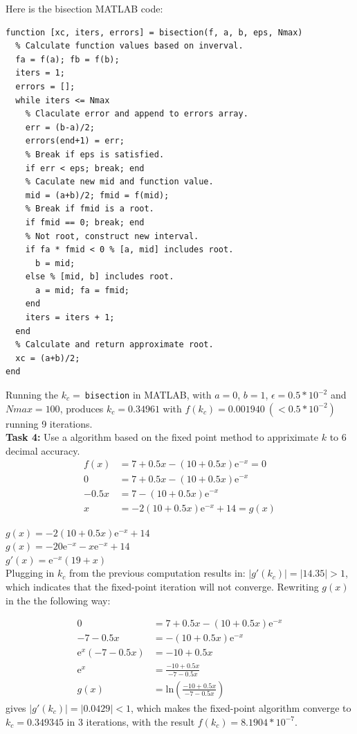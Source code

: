 \documentclass{article}
\begin{document}
  \noindent
  Here is the bisection MATLAB code:

  \begin{verbatim}
function [xc, iters, errors] = bisection(f, a, b, eps, Nmax)
  % Calculate function values based on inverval.
  fa = f(a); fb = f(b);
  iters = 1;
  errors = [];
  while iters <= Nmax
    % Claculate error and append to errors array.
    err = (b-a)/2;
    errors(end+1) = err;
    % Break if eps is satisfied.
    if err < eps; break; end
    % Caculate new mid and function value.
    mid = (a+b)/2; fmid = f(mid);
    % Break if fmid is a root.
    if fmid == 0; break; end
    % Not root, construct new interval.
    if fa * fmid < 0 % [a, mid] includes root.
      b = mid;
    else % [mid, b] includes root.
      a = mid; fa = fmid;
    end
    iters = iters + 1;
  end
  % Calculate and return approximate root.
  xc = (a+b)/2;
end
  \end{verbatim}

  \noindent
  Running the $k_c =\ $\texttt{bisection} in MATLAB, with $a=0$, $b=1$,
  $\epsilon=0.5*10^{-2}$ and $Nmax=100$, produces $k_c = 0.34961$ with $f(k_c) =
  0.001940 \ ( < 0.5*10^{-2} )$ running 9 iterations.\\

  \noindent
  \textbf{Task 4:}
  Use a algorithm based on the fixed point method to appriximate
  $k$ to 6 decimal accuracy.
  \begin{align*}
     f(x) &= 7 + 0.5x - (10 + 0.5x)\mathrm{e}^{-x} = 0\\
     0  &= 7 + 0.5x - (10 + 0.5x)\mathrm{e}^{-x} \\
     - 0.5x  &= 7 - (10 + 0.5x)\mathrm{e}^{-x} \\
     x  &= -2(10 + 0.5x)\mathrm{e}^{-x} + 14  = g(x)
  \end{align*}

  \noindent
  $ g(x) = -2(10 + 0.5x)\mathrm{e}^{-x} + 14 $ \\
  $ g(x) = -20\mathrm{e}^{-x} - x\mathrm{e}^{-x} + 14 $ \\
  $ g'(x) = \mathrm{e}^{-x}(19 + x)$ \\

  \noindent
  Plugging in $k_c$ from the previous computation results in:  $|g'(k_c)| = |14.35|
  > 1 $, which indicates that the fixed-point iteration will not converge.
  Rewriting $g(x)$ in the the following way:

  \noindent
  \begin{align*}
    0  &= 7 + 0.5x - (10 + 0.5x)\mathrm{e}^{-x} \\
    -7 -0.5x  &= -(10 + 0.5x)\mathrm{e}^{-x} \\
    \mathrm{e}^{x}(-7 -0.5x)  &= -10 + 0.5x \\
    \mathrm{e}^{x}  &= \frac{-10 + 0.5x}{-7-0.5x} \\
    g(x) &= \mathrm{ln}(\frac{-10 + 0.5x}{-7-0.5x})
  \end{align*}
  \noindent
  gives $|g'(k_c)| = |0.0429| < 1 $, which makes the fixed-point algorithm converge to
  $ k_c = 0.349345 $ in 3 iterations, with the result $f(k_c) =
  8.1904*10^{-7}$. \\
\end{document}

